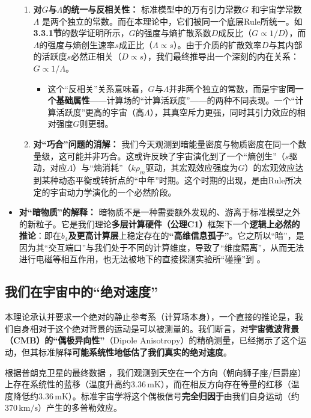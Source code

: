 \documentclass[11pt, a4paper]{article}
\begin{document}
\begin{itemize}
\begin{enumerate}
        \item \textbf{对$G$与$\Lambda$的统一与反相关性：} 标准模型中的万有引力常数$G$ \cite{Newton1687}和宇宙学常数$\Lambda$ \cite{Planck2020}是两个独立的常数。而在本理论中，它们被同一个底层Rule所统一。如\textbf{3.3.1节}的数学证明所示，$G$的强度与熵扩散系数$D$成反比（$G \propto 1/D$），而$\Lambda$的强度与熵创生速率$s$成正比（$\Lambda \propto s$）。由于介质的扩散效率$D$与其内部的活跃度$s$必然正相关（$D \propto s$），我们最终推导出一个深刻的内在关系：\textbf{$G \propto 1/\Lambda$}。
        \begin{itemize}
            \item 这个“反相关”关系意味着，$G$与$\Lambda$并非两个独立的常数，而是宇宙\textbf{同一个基础属性}——计算场的“计算活跃度”——的两种不同表现。一个“计算活跃度”更高的宇宙（高$\Lambda$），其真空斥力更强，同时其引力效应的相对强度$G$则更弱。
        \end{itemize}

        \item \textbf{对“巧合”问题的消解：}
        我们今天观测到暗能量密度与物质密度在同一个数量级，这可能并非巧合。这或许反映了宇宙演化到了一个“熵创生”（$s$驱动，对应$\Lambda$）与“熵消耗”（$k\rho_m$驱动，其宏观效应强度为$G$）的宏观效应达到某种动态平衡或转折点的“中年”时期。这个时期的出现，是由Rule所决定的宇宙动力学演化的一个必然阶段。
    \end{enumerate}

    \item \textbf{对“暗物质”的解释：}
    暗物质不是一种需要额外发现的、游离于标准模型之外的新粒子。它是我们理论\textbf{多层计算硬件（公理C1）}框架下一个\textbf{逻辑上必然的推论}：即在\textbf{$b_4$及更高计算层}上稳定存在的\textbf{“高维信息孤子”}。它之所以“暗”，是因为其“交互端口”与我们处于不同的计算维度，导致了“维度隔离”，从而无法进行电磁等相互作用，也无法被地下的直接探测实验所“碰撞”到 \cite{Planck2020}。
\end{itemize}

\subsection{我们在宇宙中的“绝对速度”}

本理论承认并要求一个绝对的静止参考系（计算场本身），一个直接的推论是，我们自身相对于这个绝对背景的运动是可以被测量的。我们断言，对\textbf{宇宙微波背景（CMB）的“偶极异向性”}（Dipole Anisotropy）的精确测量，已经揭示了这个运动，但其标准解释\textbf{可能系统性地低估了我们真实的绝对速度}。

根据普朗克卫星的最终数据 \cite{Planck2020}，我们观测到天空在一个方向（朝向狮子座/巨爵座）上存在系统性的蓝移（温度升高约$3.36\,\mathrm{mK}$），而在相反方向存在等量的红移（温度降低约$3.36\,\mathrm{mK}$）。标准宇宙学将这个偶极信号\textbf{完全归因于}由我们自身运动（约$370\,\mathrm{km/s}$）产生的多普勒效应。
\end{document}

